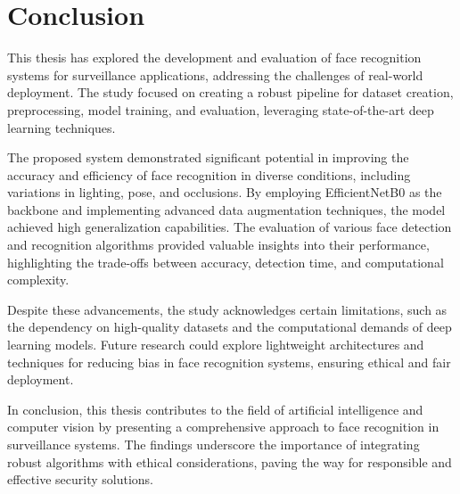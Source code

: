 \section{Conclusion}

This thesis has explored the development and evaluation of face recognition systems for surveillance applications, addressing the challenges of real-world deployment. The study focused on creating a robust pipeline for dataset creation, preprocessing, model training, and evaluation, leveraging state-of-the-art deep learning techniques.

The proposed system demonstrated significant potential in improving the accuracy and efficiency of face recognition in diverse conditions, including variations in lighting, pose, and occlusions. By employing EfficientNetB0 as the backbone and implementing advanced data augmentation techniques, the model achieved high generalization capabilities. The evaluation of various face detection and recognition algorithms provided valuable insights into their performance, highlighting the trade-offs between accuracy, detection time, and computational complexity.

Despite these advancements, the study acknowledges certain limitations, such as the dependency on high-quality datasets and the computational demands of deep learning models. Future research could explore lightweight architectures and techniques for reducing bias in face recognition systems, ensuring ethical and fair deployment.

In conclusion, this thesis contributes to the field of artificial intelligence and computer vision by presenting a comprehensive approach to face recognition in surveillance systems. The findings underscore the importance of integrating robust algorithms with ethical considerations, paving the way for responsible and effective security solutions.